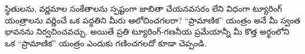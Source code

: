 \documentclass[../../../include/open-logic-section]{subfiles}
\begin{document}
\begin{prob}
  స్థితులను, వర్ణమాల సంకేతాలను స్పష్టంగా జాబితా చేయనవసరం లేని విధంగా
  ట్యూరింగ్ యంత్రాలను వర్ణించే ఒక పద్ధతిని మీరు ఆలోచించగలరా? ``ప్రామాణిక''
యంత్రం అనే మీ స్వంత భావనను నిర్వచించవచ్చు. అయితే ప్రతి ట్యూరింగ్-గణనీయ
  ప్రమేయాన్నీ మీ కొత్త అర్థంలోని ఒక ``ప్రామాణిక'' యంత్రం ఎందుకు గణించగలదో
  కూడా చెప్పండి.
\end{prob}
\end{document}
